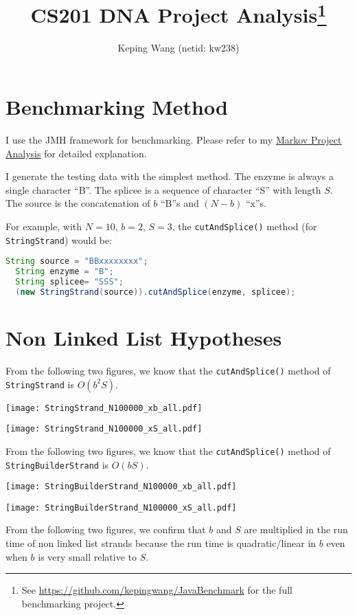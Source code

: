 \documentclass[11pt]{article}
\title{CS201 DNA Project Analysis\footnote{See \href{https://github.com/kepingwang/JavaBenchmark}{https://github.com/kepingwang/JavaBenchmark} for the full benchmarking project.}}
\author{Keping Wang (netid: kw238)}
\begin{document}
\maketitle

\section{Benchmarking Method}
I use the JMH framework for benchmarking. Please refer to my \href{https://github.com/kepingwang/JavaBenchmark/blob/master/result/analysis/analysis.pdf}{\underline{Markov Project Analysis}} for detailed explanation.

I generate the testing data with the simplest method. The enzyme is always a single character ``B''. The splicee is a sequence of character ``S'' with length $S$. The source is the concatenation of $b$ ``B''s and $(N-b)$ ``x''s.

For example, with $N=10$, $b=2$, $S=3$, the \texttt{cutAndSplice()} method (for \texttt{StringStrand}) would be:
\begin{lstlisting}[language=Java]
  String source = "BBxxxxxxxx";
  String enzyme = "B";
  String splicee= "SSS";
  (new StringStrand(source)).cutAndSplice(enzyme, splicee);
\end{lstlisting}

\section{Non Linked List Hypotheses}

From the following two figures, we know that the \texttt{cutAndSplice()} method of \texttt{StringStrand} is $O(b^2S)$.

\centerline{\texttt{[image: StringStrand\_N100000\_xb\_all.pdf]}}

\centerline{\texttt{[image: StringStrand\_N100000\_xS\_all.pdf]}}

From the following two figures, we know that the \texttt{cutAndSplice()} method of \texttt{StringBuilderStrand} is $O(bS)$.

\centerline{\texttt{[image: StringBuilderStrand\_N100000\_xb\_all.pdf]}}

\centerline{\texttt{[image: StringBuilderStrand\_N100000\_xS\_all.pdf]}}

From the following two figures, we confirm that $b$ and $S$ are multiplied in the run time of non linked list strands because the run time is quadratic/linear in $b$ even when $b$ is very small relative to $S$.
\end{document}
